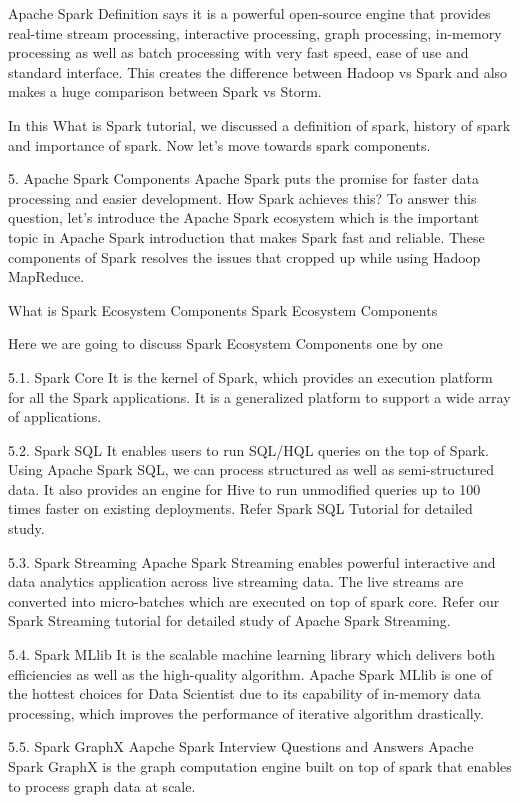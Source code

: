 Apache Spark Definition says it is a powerful open-source engine that provides real-time stream processing, interactive processing, graph processing, in-memory processing as well as batch processing with very fast speed, ease of use and standard interface. This creates the difference between Hadoop vs Spark and also makes a huge comparison between Spark vs Storm.

In this What is Spark tutorial, we discussed a definition of spark, history of spark and importance of spark. Now let’s move towards spark components.

5. Apache Spark Components
Apache Spark puts the promise for faster data processing and easier development. How Spark achieves this? To answer this question, let’s introduce the Apache Spark ecosystem which is the important topic in Apache Spark introduction that makes Spark fast and reliable. These components of Spark resolves the issues that cropped up while using Hadoop MapReduce.

What is Spark Ecosystem Components
Spark Ecosystem Components

Here we are going to discuss Spark Ecosystem Components one by one

5.1. Spark Core
It is the kernel of Spark, which provides an execution platform for all the Spark applications. It is a generalized platform to support a wide array of applications.

5.2. Spark SQL
It enables users to run SQL/HQL queries on the top of Spark. Using Apache Spark SQL, we can process structured as well as semi-structured data. It also provides an engine for Hive to run unmodified queries up to 100 times faster on existing deployments. Refer Spark SQL Tutorial for detailed study.

5.3. Spark Streaming
Apache Spark Streaming enables powerful interactive and data analytics application across live streaming data. The live streams are converted into micro-batches which are executed on top of spark core. Refer our Spark Streaming tutorial for detailed study of Apache Spark Streaming.

5.4. Spark MLlib
It is the scalable machine learning library which delivers both efficiencies as well as the high-quality algorithm. Apache Spark MLlib is one of the hottest choices for Data Scientist due to its capability of in-memory data processing, which improves the performance of iterative algorithm drastically.

5.5. Spark GraphX
 Aapche Spark Interview Questions and Answers
Apache Spark GraphX is the graph computation engine built on top of spark that enables to process graph data at scale.

